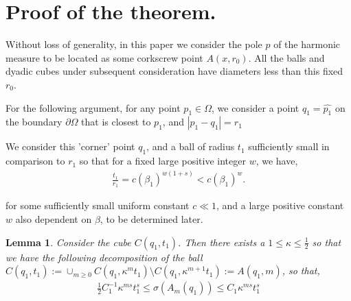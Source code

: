 \documentclass{article}
\newcounter{lem}
\theoremstyle{plain}
\theoremstyle{plain}
\newtheorem{lemma}[theorem]{Lemma}
\theoremstyle{definition}
\theoremstyle{plain}
\begin{document}
\section{Proof of the theorem.}

    
Without loss of generality, in this paper we consider the pole $p$ of the harmonic measure to be located as some corkscrew point $A(x,r_0)$. All the balls and dyadic cubes under subsequent consideration have diameters less than this fixed $r_0$.






 
 
    
      

    
    
    

 

      
    For the following argument, for any point $p_1 \in \Omega$, we consider a point $q_1=\widehat{p_1}$ on the boundary $\partial\Omega$ that is closest to $p_1$, and $|p_1 -q_1|=r_1$

      We consider this 'corner' point $q_1$, and a ball of radius $t_1$ sufficiently small in comparison to $r_1$ so that for a fixed large positive integer $w$, we have, 
      \begin{align}\label{separate}
      \frac{t_1}{r_1}= c (\beta_1)^{w(1+s)}< c(\beta_1)^{w}.
      \end{align}
      
      for some sufficiently small uniform constant $c\ll 1$, and a large positive constant $w$ also dependent on $\beta$, to be determined later.

      \begin{lemma}
          Consider the cube $C(q_1,t_1)$. Then there exists a $1 \leq \kappa\leq \frac{1}{2}$ so that we have the following decomposition of the ball $C(q_1,t_1):=\cup_{m\geq 0}C(q_1,\kappa^m t_1)\setminus C(q_1,\kappa^{m+1}t_1) :=A(q_1,m)$, so that, 
        \begin{align}\label{eq10}
    \frac{1}{2}  C_{1}^{-1} \kappa^{ms}t_{1}^{s}\leq \sigma(A_m (q_1))\leq C_1 \kappa^{ms} t_{1}^s
\end{align}
      \end{lemma}
\end{document}
